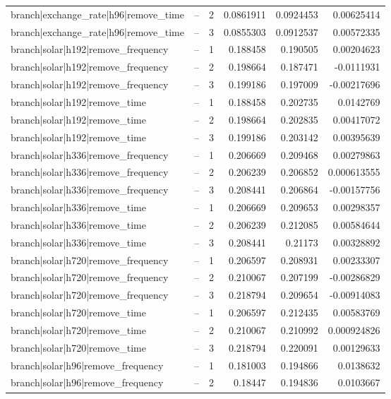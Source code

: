 \begin{longtable}{llrrrr}
branch|exchange\_rate|h96|remove\_time & -- & 2 & 0.0861911 & 0.0924453 & 0.00625414 \\
branch|exchange\_rate|h96|remove\_time & -- & 3 & 0.0855303 & 0.0912537 & 0.00572335 \\
branch|solar|h192|remove\_frequency & -- & 1 & 0.188458 & 0.190505 & 0.00204623 \\
branch|solar|h192|remove\_frequency & -- & 2 & 0.198664 & 0.187471 & -0.0111931 \\
branch|solar|h192|remove\_frequency & -- & 3 & 0.199186 & 0.197009 & -0.00217696 \\
branch|solar|h192|remove\_time & -- & 1 & 0.188458 & 0.202735 & 0.0142769 \\
branch|solar|h192|remove\_time & -- & 2 & 0.198664 & 0.202835 & 0.00417072 \\
branch|solar|h192|remove\_time & -- & 3 & 0.199186 & 0.203142 & 0.00395639 \\
branch|solar|h336|remove\_frequency & -- & 1 & 0.206669 & 0.209468 & 0.00279863 \\
branch|solar|h336|remove\_frequency & -- & 2 & 0.206239 & 0.206852 & 0.000613555 \\
branch|solar|h336|remove\_frequency & -- & 3 & 0.208441 & 0.206864 & -0.00157756 \\
branch|solar|h336|remove\_time & -- & 1 & 0.206669 & 0.209653 & 0.00298357 \\
branch|solar|h336|remove\_time & -- & 2 & 0.206239 & 0.212085 & 0.00584644 \\
branch|solar|h336|remove\_time & -- & 3 & 0.208441 & 0.21173 & 0.00328892 \\
branch|solar|h720|remove\_frequency & -- & 1 & 0.206597 & 0.208931 & 0.00233307 \\
branch|solar|h720|remove\_frequency & -- & 2 & 0.210067 & 0.207199 & -0.00286829 \\
branch|solar|h720|remove\_frequency & -- & 3 & 0.218794 & 0.209654 & -0.00914083 \\
branch|solar|h720|remove\_time & -- & 1 & 0.206597 & 0.212435 & 0.00583769 \\
branch|solar|h720|remove\_time & -- & 2 & 0.210067 & 0.210992 & 0.000924826 \\
branch|solar|h720|remove\_time & -- & 3 & 0.218794 & 0.220091 & 0.00129633 \\
branch|solar|h96|remove\_frequency & -- & 1 & 0.181003 & 0.194866 & 0.0138632 \\
branch|solar|h96|remove\_frequency & -- & 2 & 0.18447 & 0.194836 & 0.0103667 \\

\end{longtable}
